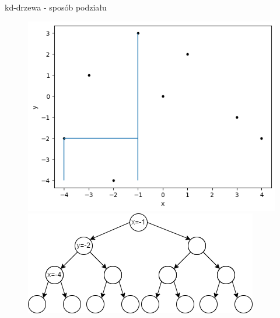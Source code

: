 \documentclass[aspectratio=169,dvipsnames]{beamer}
\begin{document}
\begin{frame}{kd-drzewa - sposób podziału}
    \begin{figure}[H]
        \centering
          \begin{minipage}{0.5\textwidth}
            \centering
            \includegraphics[width=\linewidth]{images/plots/4.png}
          \end{minipage}%
          \begin{minipage}{0.5\textwidth}
            \centering
            \includegraphics[width=\linewidth]{images/trees/4.drawio.png}
          \end{minipage}
    \end{figure}
\end{frame}
\end{document}
